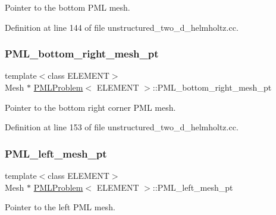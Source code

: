 Pointer to the bottom P\+ML mesh. 



Definition at line 144 of file unstructured\+\_\+two\+\_\+d\+\_\+helmholtz.\+cc.

\mbox{\label{classPMLProblem_a51dccc650129c0afd903b4c359a4e6dd}} 
\subsubsection{\texorpdfstring{P\+M\+L\+\_\+bottom\+\_\+right\+\_\+mesh\+\_\+pt}{PML\_bottom\_right\_mesh\_pt}}
{\footnotesize\ttfamily template$<$class E\+L\+E\+M\+E\+NT$>$ \\
Mesh $\ast$ \hyperlink{classPMLProblem}{P\+M\+L\+Problem}$<$ E\+L\+E\+M\+E\+NT $>$\+::P\+M\+L\+\_\+bottom\+\_\+right\+\_\+mesh\+\_\+pt\hspace{0.3cm}{\ttfamily [private]}}



Pointer to the bottom right corner P\+ML mesh. 



Definition at line 153 of file unstructured\+\_\+two\+\_\+d\+\_\+helmholtz.\+cc.

\mbox{\label{classPMLProblem_ab7376c789c76f1150ebbbdf253969136}} 
\subsubsection{\texorpdfstring{P\+M\+L\+\_\+left\+\_\+mesh\+\_\+pt}{PML\_left\_mesh\_pt}}
{\footnotesize\ttfamily template$<$class E\+L\+E\+M\+E\+NT$>$ \\
Mesh $\ast$ \hyperlink{classPMLProblem}{P\+M\+L\+Problem}$<$ E\+L\+E\+M\+E\+NT $>$\+::P\+M\+L\+\_\+left\+\_\+mesh\+\_\+pt\hspace{0.3cm}{\ttfamily [private]}}



Pointer to the left P\+ML mesh. 



